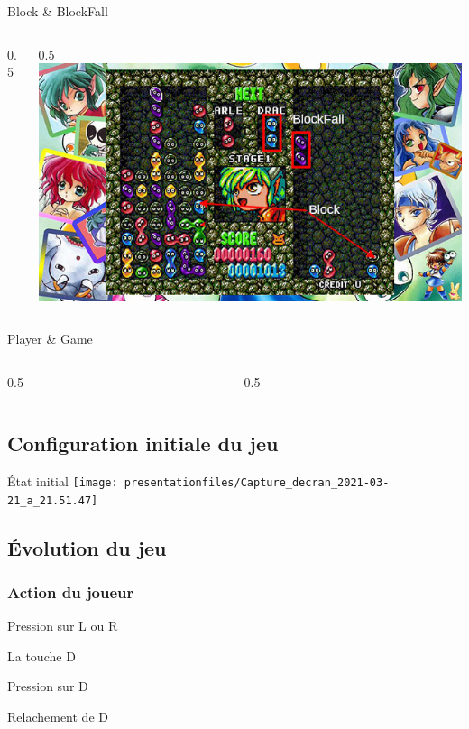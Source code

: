 \documentclass[10pt,dvipsnames,final]{beamer}
\newcommand{\midcolumn}[2]{
\begin{columns}
	\begin{column}{0.5\textwidth}
		#1
	\end{column}
	\begin{column}{0.5\textwidth}
		#2
	\end{column}
\end{columns}
}
\begin{document}
\begin{frame}{Block \& BlockFall}
\midcolumn{}{\includegraphics[width=\textwidth]{presentationfiles/Block-BlockFall-pp.jpg}}
\end{frame}

\begin{frame}{Player \& Game}
\midcolumn{}{}
\end{frame}

\subsection{Configuration initiale du jeu}

\begin{frame}{État initial}
\texttt{[image: presentationfiles/Capture\_decran\_2021-03-21\_a\_21.51.47]} 
\end{frame}

\subsection{Évolution du jeu}

\subsubsection{Action du joueur}

\begin{frame}{Pression sur L ou R}

\end{frame}

\begin{frame}{La touche D}
\begin{block}{Pression sur D}

\end{block}
\begin{block}{Relachement de D}

\end{block}
\end{frame}
\end{document}
